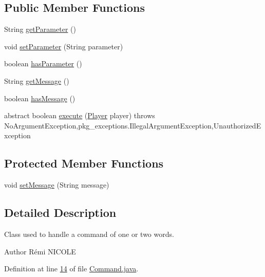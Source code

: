 \subsection*{Public Member Functions}
\begin{DoxyCompactItemize}
\item 
String \hyperlink{classpkg__commands_1_1Command_a41c92d445be73ea9d62320c65efb8434}{get\-Parameter} ()
\item 
void \hyperlink{classpkg__commands_1_1Command_a18446243a5fd360e9341b4b141c0cccc}{set\-Parameter} (String parameter)
\item 
boolean \hyperlink{classpkg__commands_1_1Command_a02af95ab3f1898a66259ab7c177b6998}{has\-Parameter} ()
\item 
String \hyperlink{classpkg__commands_1_1Command_ac2a42e2bab264821892daefaf9a18b6c}{get\-Message} ()
\item 
boolean \hyperlink{classpkg__commands_1_1Command_ae46bb048d0fa705a5037a5204b530da2}{has\-Message} ()
\item 
abstract boolean \hyperlink{classpkg__commands_1_1Command_a19008923c75a87c87d1f3ba8bf8be43f}{execute} (\hyperlink{classpkg__world_1_1Player}{Player} player)  throws No\-Argument\-Exception,pkg\-\_\-exceptions.\-Illegal\-Argument\-Exception,\-Unauthorized\-Exception
\end{DoxyCompactItemize}
\subsection*{Protected Member Functions}
\begin{DoxyCompactItemize}
\item 
void \hyperlink{classpkg__commands_1_1Command_ae210ff216fe908b111ba1c988a963d13}{set\-Message} (String message)
\end{DoxyCompactItemize}


\subsection{Detailed Description}
Class used to handle a command of one or two words. \begin{DoxyAuthor}{Author}
Rémi N\-I\-C\-O\-L\-E 
\end{DoxyAuthor}


Definition at line \hyperlink{Command_8java_source_l00014}{14} of file \hyperlink{Command_8java_source}{Command.\-java}.



